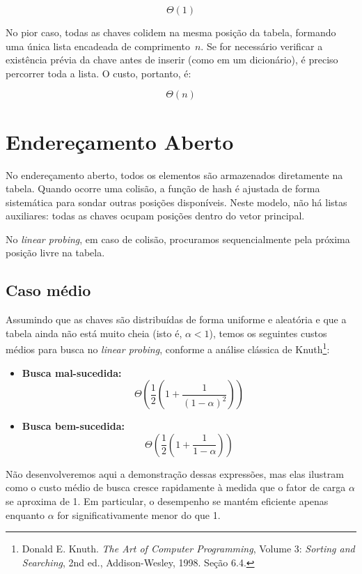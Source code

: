 \[
\Theta(1)
\]

No pior caso, todas as chaves colidem na mesma posição da tabela, formando uma única lista encadeada de comprimento~$n$. 
Se for necessário verificar a existência prévia da chave antes de inserir (como em um dicionário), é preciso percorrer toda a lista. 
O custo, portanto, é:

\[
\Theta(n)
\]

\section{Endereçamento Aberto}

No endereçamento aberto, todos os elementos são armazenados diretamente na tabela. 
Quando ocorre uma colisão, a função de hash é ajustada de forma sistemática para sondar outras posições disponíveis. 
Neste modelo, não há listas auxiliares: todas as chaves ocupam posições dentro do vetor principal.

No \emph{linear probing}, em caso de colisão, procuramos sequencialmente pela próxima posição livre na tabela. 

\subsection*{Caso médio}

Assumindo que as chaves são distribuídas de forma uniforme e aleatória e que a tabela ainda não está muito cheia (isto é, $\alpha < 1$), temos os seguintes custos médios para busca no \emph{linear probing}, conforme a análise clássica de Knuth\footnote{Donald E. Knuth. \textit{The Art of Computer Programming}, Volume 3: \textit{Sorting and Searching}, 2nd ed., Addison-Wesley, 1998. Seção 6.4.}:

\begin{itemize}
  \item \textbf{Busca mal-sucedida:}
  \[
  \Theta\left( \frac{1}{2} \left(1 + \frac{1}{(1 - \alpha)^2} \right) \right)
  \]

  \item \textbf{Busca bem-sucedida:}
  \[
  \Theta\left( \frac{1}{2} \left(1 + \frac{1}{1 - \alpha} \right) \right)
  \]
\end{itemize}

Não desenvolveremos aqui a demonstração dessas expressões, mas elas ilustram como o custo médio de busca cresce rapidamente à medida que o fator de carga $\alpha$ se aproxima de 1. 
Em particular, o desempenho se mantém eficiente apenas enquanto $\alpha$ for significativamente menor do que 1.

